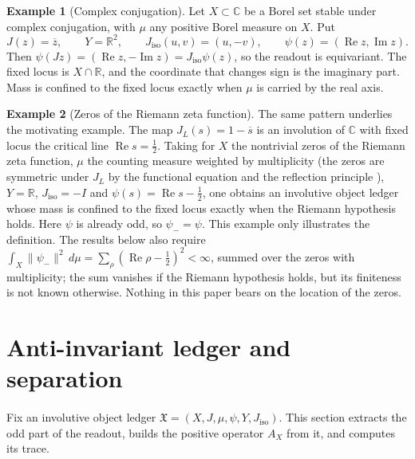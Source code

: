 \documentclass[11pt]{article}
\newcommand{\psim}{\psi_{-}}
\newcommand{\AX}{A_{X}}
\newcommand{\Jiso}{J_{\mathrm{iso}}}
\newcommand{\IOL}{\hat{\mathfrak{X}}}
\theoremstyle{definition}
\newtheorem*{example}{Example}
\begin{document}
\begin{example}[Complex conjugation]
Let \(X\subset\mathbb{C}\) be a Borel set stable under complex
conjugation, with \(\mu\) any positive Borel measure on \(X\).  Put
\[
  J(z)=\overline{z},\qquad
  Y=\mathbb{R}^2,\qquad
  \Jiso(u,v)=(u,-v),\qquad
  \psi(z)=(\operatorname{Re}z,\operatorname{Im}z).
\]
Then \(\psi(Jz)=(\operatorname{Re}z,-\operatorname{Im}z)=\Jiso\psi(z)\),
so the readout is equivariant.  The fixed locus is \(X\cap\mathbb{R}\),
and the coordinate that changes sign is the imaginary part.  Mass is
confined to the fixed locus exactly when \(\mu\) is carried by the real
axis.
\end{example}

\begin{example}[Zeros of the Riemann zeta function]
The same pattern underlies the motivating example.  The map
\(J_L(s)=1-\overline{s}\) is an involution of \(\mathbb{C}\) with fixed
locus the critical line \(\operatorname{Re}s=\tfrac12\).  Taking for
\(X\) the nontrivial zeros of the Riemann zeta function, \(\mu\) the
counting measure weighted by multiplicity (the zeros are symmetric
under \(J_L\) by the functional equation and the reflection principle
\citep{TitchmarshHeathBrown1986}), \(Y=\mathbb{R}\),
\(\Jiso=-I\) and \(\psi(s)=\operatorname{Re}s-\tfrac12\), one obtains an
involutive object ledger whose mass is confined to the fixed locus
exactly when the Riemann hypothesis holds.  Here \(\psi\) is already
odd, so \(\psim=\psi\).  This example only illustrates the definition.
The results below also require
\(\int_X\|\psim\|^2\,d\mu=\sum_\rho(\operatorname{Re}\rho-\tfrac12)^2<\infty\),
summed over the zeros with multiplicity; the sum vanishes if the
Riemann hypothesis holds, but its finiteness is not known otherwise.
Nothing in this paper bears on the location of the zeros.
\end{example}
 \section{Anti-invariant ledger and separation}
\label{sec:anti_invariant_ledger}

Fix an involutive object ledger \(\IOL=(X,J,\mu,\psi,Y,\Jiso)\).  This
section extracts the odd part of the readout, builds the positive
operator \(\AX\) from it, and computes its trace.
\end{document}
